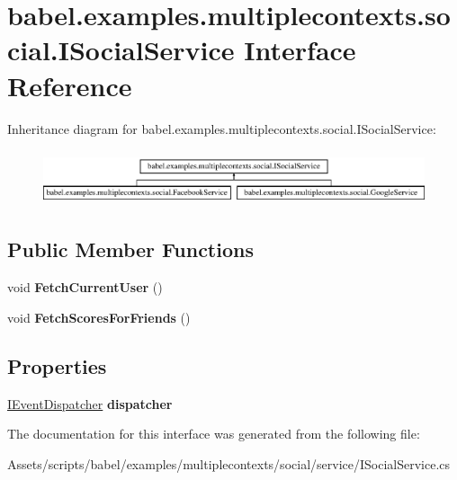\hypertarget{interfacebabel_1_1examples_1_1multiplecontexts_1_1social_1_1_i_social_service}{\section{babel.\-examples.\-multiplecontexts.\-social.\-I\-Social\-Service Interface Reference}
\label{interfacebabel_1_1examples_1_1multiplecontexts_1_1social_1_1_i_social_service}
}
Inheritance diagram for babel.\-examples.\-multiplecontexts.\-social.\-I\-Social\-Service\-:\begin{figure}[H]
\begin{center}
\leavevmode
\includegraphics[height=1.647059cm]{interfacebabel_1_1examples_1_1multiplecontexts_1_1social_1_1_i_social_service}
\end{center}
\end{figure}
\subsection*{Public Member Functions}
\begin{DoxyCompactItemize}
\item 
\hypertarget{interfacebabel_1_1examples_1_1multiplecontexts_1_1social_1_1_i_social_service_a5af66db988cfdc0dc1b61adbdfc67676}{void {\bfseries Fetch\-Current\-User} ()}\label{interfacebabel_1_1examples_1_1multiplecontexts_1_1social_1_1_i_social_service_a5af66db988cfdc0dc1b61adbdfc67676}

\item 
\hypertarget{interfacebabel_1_1examples_1_1multiplecontexts_1_1social_1_1_i_social_service_aa33ba297a8d98136a2dc2473c0a8bcdb}{void {\bfseries Fetch\-Scores\-For\-Friends} ()}\label{interfacebabel_1_1examples_1_1multiplecontexts_1_1social_1_1_i_social_service_aa33ba297a8d98136a2dc2473c0a8bcdb}

\end{DoxyCompactItemize}
\subsection*{Properties}
\begin{DoxyCompactItemize}
\item 
\hypertarget{interfacebabel_1_1examples_1_1multiplecontexts_1_1social_1_1_i_social_service_a6270356b2da05df7deb27d847de6311d}{\hyperlink{interfacebabel_1_1extensions_1_1dispatcher_1_1eventdispatcher_1_1api_1_1_i_event_dispatcher}{I\-Event\-Dispatcher} {\bfseries dispatcher}}\label{interfacebabel_1_1examples_1_1multiplecontexts_1_1social_1_1_i_social_service_a6270356b2da05df7deb27d847de6311d}

\end{DoxyCompactItemize}


The documentation for this interface was generated from the following file\-:\begin{DoxyCompactItemize}
\item 
Assets/scripts/babel/examples/multiplecontexts/social/service/I\-Social\-Service.\-cs\end{DoxyCompactItemize}
